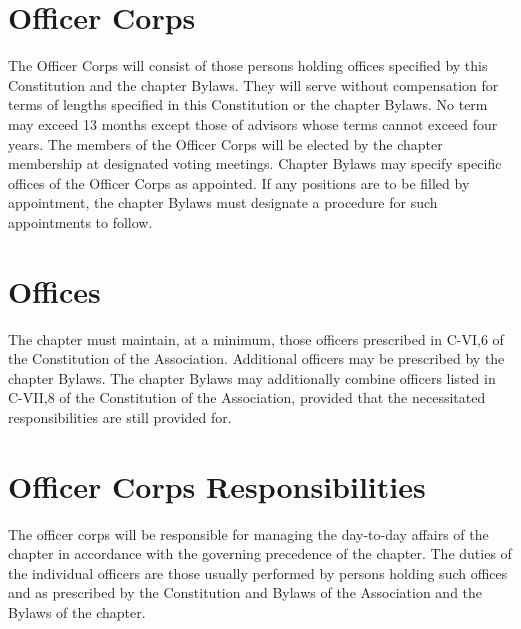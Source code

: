 \section{Officer Corps}
The Officer Corps will consist of those persons holding offices specified by this Constitution and the chapter Bylaws. They will serve without compensation for terms of lengths specified in this Constitution or the chapter Bylaws. No term may exceed 13 months except those of advisors whose terms cannot exceed four years. The members of the Officer Corps will be elected by the chapter membership at designated voting meetings. Chapter Bylaws may specify specific offices of the Officer Corps as appointed. If any positions are to be filled by appointment, the chapter Bylaws must designate a procedure for such appointments to follow.

\section{Offices} The chapter must maintain, at a minimum, those officers prescribed in C-VI,6 of the Constitution of the Association. Additional officers may be prescribed by the chapter Bylaws. The chapter Bylaws may additionally combine officers listed in C-VII,8 of the Constitution of the Association, provided that the necessitated responsibilities are still provided for.

\section{Officer Corps Responsibilities} The officer corps will be responsible for managing the day-to-day affairs of the chapter in accordance with the governing precedence of the chapter.  The duties of the individual officers are those usually performed by persons holding such offices and as prescribed by the Constitution and Bylaws of the Association and the Bylaws of the chapter.

